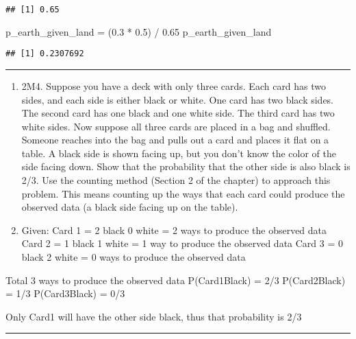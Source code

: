 \documentclass[
]{article}
\newenvironment{Shaded}{\begin{snugshade}}{\end{snugshade}}
\newcommand{\FloatTok}[1]{\textcolor[rgb]{0.00,0.00,0.81}{#1}}
\newcommand{\NormalTok}[1]{#1}
\newcommand{\OtherTok}[1]{\textcolor[rgb]{0.56,0.35,0.01}{#1}}
\newcommand{\SpecialCharTok}[1]{\textcolor[rgb]{0.00,0.00,0.00}{#1}}
\begin{document}
\begin{verbatim}
## [1] 0.65
\end{verbatim}

\begin{Shaded}
\begin{Highlighting}[]
\NormalTok{p\_earth\_given\_land }\OtherTok{=}\NormalTok{ (}\FloatTok{0.3} \SpecialCharTok{*} \FloatTok{0.5}\NormalTok{) }\SpecialCharTok{/} \FloatTok{0.65}
\NormalTok{p\_earth\_given\_land}
\end{Highlighting}
\end{Shaded}

\begin{verbatim}
## [1] 0.2307692
\end{verbatim}

\begin{center}\rule{0.5\linewidth}{0.5pt}\end{center}

\begin{enumerate}
\def\labelenumi{\Alph{enumi})}
\setcounter{enumi}{16}
\item
  2M4. Suppose you have a deck with only three cards. Each card has two
  sides, and each side is either black or white. One card has two black
  sides. The second card has one black and one white side. The third
  card has two white sides. Now suppose all three cards are placed in a
  bag and shuffled. Someone reaches into the bag and pulls out a card
  and places it flat on a table. A black side is shown facing up, but
  you don't know the color of the side facing down. Show that the
  probability that the other side is also black is 2/3. Use the counting
  method (Section 2 of the chapter) to approach this problem. This means
  counting up the ways that each card could produce the observed data (a
  black side facing up on the table).
\item
  Given: Card 1 = 2 black 0 white = 2 ways to produce the observed data
  Card 2 = 1 black 1 white = 1 way to produce the observed data Card 3 =
  0 black 2 white = 0 ways to produce the observed data
\end{enumerate}

Total 3 ways to produce the observed data P(Card1\textbar Black) = 2/3
P(Card2\textbar Black) = 1/3 P(Card3\textbar Black) = 0/3

Only Card1 will have the other side black, thus that probability is 2/3

\begin{center}\rule{0.5\linewidth}{0.5pt}\end{center}
\end{document}
